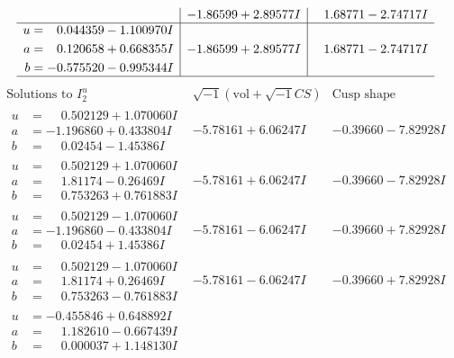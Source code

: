 \documentclass[1p]{elsarticle_modified}
\theoremstyle{definition}
\newcommand{\I}{\sqrt{-1}}
\begin{document}
$$\begin{array}{c|c|c}
 & -1.86599 + 2.89577 I & \phantom{-}1.68771 - 2.74717 I \\ \hline\begin{aligned}
u &= \phantom{-}0.044359 - 1.100970 I \\
a &= \phantom{-}0.120658 + 0.668355 I \\
b &= -0.575520 - 0.995344 I\end{aligned}
 & -1.86599 + 2.89577 I & \phantom{-}1.68771 - 2.74717 I\\
 \hline 
 \end{array}$$\newpage$$\begin{array}{c|c|c}  
\text{Solutions to }I^u_{2}& \I (\text{vol} + \sqrt{-1}CS) & \text{Cusp shape}\\
 \hline 
\begin{aligned}
u &= \phantom{-}0.502129 + 1.070060 I \\
a &= -1.196860 + 0.433804 I \\
b &= \phantom{-}0.02454 - 1.45386 I\end{aligned}
 & -5.78161 + 6.06247 I & -0.39660 - 7.82928 I \\ \hline\begin{aligned}
u &= \phantom{-}0.502129 + 1.070060 I \\
a &= \phantom{-}1.81174 - 0.26469 I \\
b &= \phantom{-}0.753263 + 0.761883 I\end{aligned}
 & -5.78161 + 6.06247 I & -0.39660 - 7.82928 I \\ \hline\begin{aligned}
u &= \phantom{-}0.502129 - 1.070060 I \\
a &= -1.196860 - 0.433804 I \\
b &= \phantom{-}0.02454 + 1.45386 I\end{aligned}
 & -5.78161 - 6.06247 I & -0.39660 + 7.82928 I \\ \hline\begin{aligned}
u &= \phantom{-}0.502129 - 1.070060 I \\
a &= \phantom{-}1.81174 + 0.26469 I \\
b &= \phantom{-}0.753263 - 0.761883 I\end{aligned}
 & -5.78161 - 6.06247 I & -0.39660 + 7.82928 I \\ \hline\begin{aligned}
u &= -0.455846 + 0.648892 I \\
a &= \phantom{-}1.182610 - 0.667439 I \\
b &= \phantom{-}0.000037 + 1.148130 I\end{aligned}

\end{array}$$
\end{document}
